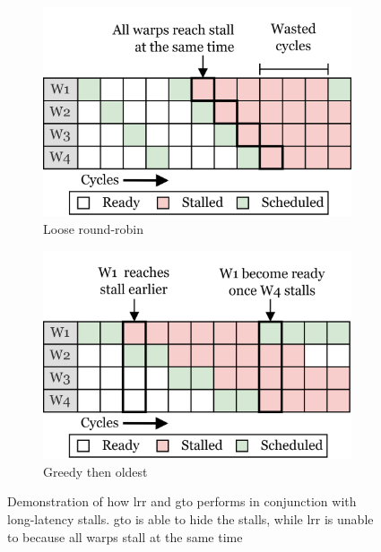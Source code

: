 \begin{figure}
     \centering
     \begin{subfigure}[b]{0.49\textwidth}
         \centering
         \includegraphics[width=\textwidth]{figures/warp-scheduling-lrr-stall-2.png}
         \caption{Loose round-robin}
         \label{fig:lrr-lls}
     \end{subfigure}
     \hfill
     \begin{subfigure}[b]{0.49\textwidth}
         \centering
         \includegraphics[width=\textwidth]{figures/warp-scheduling-gto-stall-2.png}
         \caption{Greedy then oldest}
         \label{fig:gto-lls}
     \end{subfigure}
        \caption[Demonstration of how \acrshort{lrr} and \acrshort{gto} handles long-latency stalls]{Demonstration of how \acrshort{lrr} and \acrshort{gto} performs in conjunction with long-latency stalls. \acrshort{gto} is able to hide the stalls, while \acrshort{lrr} is unable to because all warps stall at the same time}
        \label{fig:lrr-gto-lls}
\end{figure}


